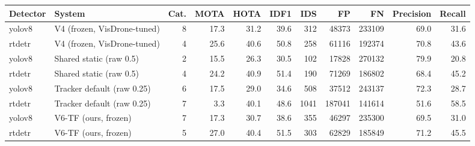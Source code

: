 \begin{tabular}{llrrrrrrrrr}
\toprule
Detector & System & Cat. & MOTA & HOTA & IDF1 & IDS & FP & FN & Precision & Recall \\
\midrule
yolov8 & V4 (frozen, VisDrone-tuned) & 8 & 17.3 & 31.2 & 39.6 & 312 & 48373 & 233109 & 69.0 & 31.6 \\
rtdetr & V4 (frozen, VisDrone-tuned) & 4 & 25.6 & 40.6 & 50.8 & 258 & 61116 & 192374 & 70.8 & 43.6 \\
yolov8 & Shared static (raw 0.5) & 2 & 15.5 & 26.3 & 30.5 & 102 & 17828 & 270132 & 79.9 & 20.8 \\
rtdetr & Shared static (raw 0.5) & 4 & 24.2 & 40.9 & 51.4 & 190 & 71269 & 186802 & 68.4 & 45.2 \\
yolov8 & Tracker default (raw 0.25) & 6 & 17.5 & 29.0 & 34.6 & 508 & 37512 & 243137 & 72.3 & 28.7 \\
rtdetr & Tracker default (raw 0.25) & 7 & 3.3 & 40.1 & 48.6 & 1041 & 187041 & 141614 & 51.6 & 58.5 \\
yolov8 & V6-TF (ours, frozen) & 7 & 17.3 & 30.7 & 38.6 & 355 & 46297 & 235300 & 69.5 & 31.0 \\
rtdetr & V6-TF (ours, frozen) & 5 & 27.0 & 40.4 & 51.5 & 303 & 62829 & 185849 & 71.2 & 45.5 \\
\bottomrule
\end{tabular}
